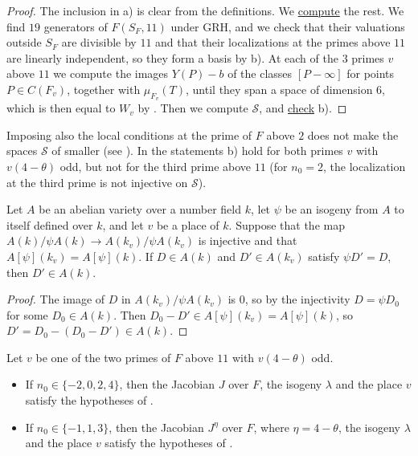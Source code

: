 \documentclass[11pt,reqno]{amsart}
\newcommand{\repocommit}{c12c8c3705ed0b6b52254df69bd5ffe84542d568}
\newcommand{\gitlink}[2]{\href{https://github.com/F-Najman/Xns-121-/blob/\repocommit/#1}{#2}}
\newcommand{\githubbare}[1]{\href{https://github.com/F-Najman/Xns-121-/blob/\repocommit/#1}{\path{#1}}}
\theoremstyle{definition}
\numberwithin{equation}{section}
\begin{document}
\begin{proof}
The inclusion in a) is clear from the definitions. We \gitlink{code/even_selmer.m}{compute} the rest. We find $19$ generators of $F(S_F,11)$ under GRH, and we check that their valuations outside $S_F$ are divisible by $11$ and that their localizations at the primes above $11$ are linearly independent, so they form a basis by  b). At each of the $3$ primes $v$ above $11$ we compute the images $Y(P)-b$ of the classes $[P-\infty]$ for points $P\in C(F_v)$, together with $\mu_{F_v}(T)$, until they span a space of dimension $6$, which is then equal to $W_v$ by . Then we compute $\mathcal S$, and \gitlink{code/single_place.m}{check} b).
\end{proof}

\begin{remark}
Imposing also the local conditions at the prime of $F$ above $2$ does not make the spaces $\mathcal S$ of  smaller (see \githubbare{code/even_selmer.m}). In  the statements b) hold for both primes $v$ with $v(4-\theta)$ odd, but not for the third prime above $11$ (for $n_0=2$, the localization at the third prime is not injective on $\mathcal S$).
\end{remark}

\begin{lemma}\label{lem:division}
Let $A$ be an abelian variety over a number field $k$, let $\psi$ be an isogeny from $A$ to itself defined over $k$, and let $v$ be a place of $k$. Suppose that the map $A(k)/\psi A(k)\rightarrow A(k_v)/\psi A(k_v)$ is injective and that $A[\psi](k_v)=A[\psi](k)$. If $D\in A(k)$ and $D'\in A(k_v)$ satisfy $\psi D'=D$, then $D'\in A(k)$.
\end{lemma}

\begin{proof}
The image of $D$ in $A(k_v)/\psi A(k_v)$ is $0$, so by the injectivity $D=\psi D_0$ for some $D_0\in A(k)$. Then $D_0-D'\in A[\psi](k_v)=A[\psi](k)$, so $D'=D_0-(D_0-D')\in A(k)$.
\end{proof}

\begin{lemma}\label{lem:division_hyp}
Let $v$ be one of the two primes of $F$ above $11$ with $v(4-\theta)$ odd.
\begin{itemize}
\item[a)] If $n_0\in\{-2,0,2,4\}$, then the Jacobian $J$ over $F$, the isogeny $\lambda$ and the place $v$ satisfy the hypotheses of .
\item[b)] If $n_0\in\{-1,1,3\}$, then the Jacobian $J^\eta$ over $F$, where $\eta=4-\theta$, the isogeny $\lambda$ and the place $v$ satisfy the hypotheses of .
\end{itemize}
\end{lemma}
\end{document}
